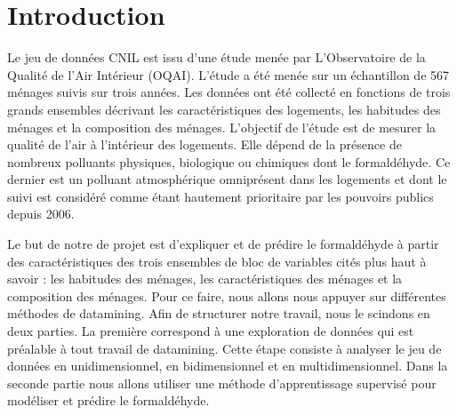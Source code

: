 \documentclass[11pt,a4paper, x11names]{article}\usepackage[]{graphicx}\usepackage[]{color}
\begin{document}

\tableofcontents
\begin{abstract}
\end{abstract}
\section{Introduction}
Le jeu de données CNIL est issu d'une étude menée par L'Observatoire de la Qualité de l'Air Intérieur (OQAI). L'étude a été menée sur un échantillon de 567 ménages suivis sur trois années. Les données ont été collecté en fonctions de trois grands ensembles décrivant les caractéristiques des logements, les habitudes des ménages et la composition des ménages. L'objectif de l'étude est de mesurer la qualité de l'air à l'intérieur des logements. Elle dépend de la présence de nombreux polluants physiques, biologique ou chimiques dont le formaldéhyde. Ce dernier est un polluant atmosphérique omniprésent dans les logements et dont le suivi est considéré comme étant hautement prioritaire par les pouvoirs publics depuis 2006. \par
Le but de notre de projet est d'expliquer et de prédire le formaldéhyde à partir des caractéristiques des trois ensembles de bloc de variables cités plus haut à savoir : les habitudes des ménages, les caractéristiques des ménages et la composition des ménages. Pour ce faire, nous allons nous appuyer sur différentes méthodes de datamining.
Afin de structurer notre travail, nous le scindons en deux parties. La première correspond à une exploration de données qui est préalable à tout travail de datamining. Cette étape consiste à analyser le jeu de données en unidimensionnel, en bidimensionnel et en multidimensionnel. Dans la seconde partie nous allons utiliser une méthode d'apprentissage supervisé pour modéliser et prédire le formaldéhyde.



\end{document}
